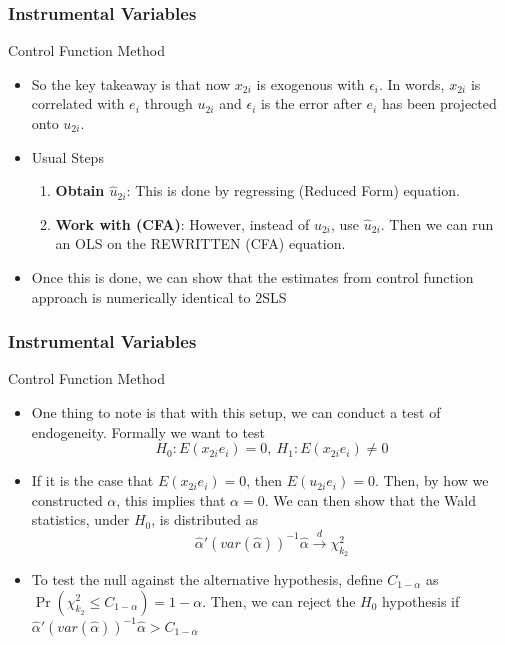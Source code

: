 \documentclass{beamer}
\begin{document}
\begin{frame}
\frametitle{Instrumental Variables}
Control Function Method
\begin{itemize}
\item So the key takeaway is that now $x_{2i}$ is exogenous with $\epsilon_i$. In words, $x_{2i}$ is correlated with $e_i$ through $u_{2i}$ and $\epsilon_i$ is the error after $e_i$ has been projected onto $u_{2i}$. 
\item Usual Steps
\begin{enumerate}
\item \textbf{Obtain $\hat{u}_{2i}$}: This is done by regressing (Reduced Form) equation. 
\item \textbf{Work with (CFA)}: However, instead of $u_{2i}$, use $\hat{u}_{2i}$. Then we can run an OLS on the REWRITTEN (CFA) equation. 
\end{enumerate}
\item Once this is done, we can show that the estimates from control function approach is numerically identical to 2SLS
\end{itemize}
\end{frame}

\begin{frame}
\frametitle{Instrumental Variables}
Control Function Method
\begin{itemize}
\item One thing to note is that with this setup, we can conduct a test of endogeneity. Formally we want to test
\[
H_0: E(x_{2i}e_i)=0, \ H_1:E(x_{2i}e_i)\neq0
\]
\item If it is the case that $E(x_{2i}e_i)=0$, then $E(u_{2i}e_i)=0$. Then, by how we constructed $\alpha$, this implies that $\alpha=0$. We can then show that the Wald statistics, under $H_0$, is distributed as
\[
\hat{\alpha}'(var(\hat{\alpha}))^{-1}\hat{\alpha}\xrightarrow{d}\chi^2_{k_2}
\]
\item To test the null against the alternative hypothesis, define $C_{1-\alpha}$ as $\Pr(\chi_{k_2}^2\leq C_{1-\alpha})=1-\alpha$. Then, we can reject the $H_0$ hypothesis if $\hat{\alpha}'(var(\hat{\alpha}))^{-1}\hat{\alpha}>C_{1-\alpha}$
\end{itemize}
\end{frame}
\end{document}
